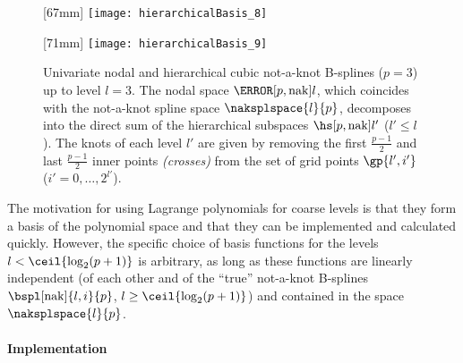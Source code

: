 \begin{figure}
  [67mm]{%
    \texttt{[image: hierarchicalBasis\_8]}%
  }%
  \hfill%
  \hfill%
  [71mm]{%
    \texttt{[image: hierarchicalBasis\_9]}%
  }%
  \caption[%
    Nodal and hierarchical not-a-knot B-splines%
  ]{%
    Univariate nodal and hierarchical cubic not-a-knot B-splines ($p = 3$)
    up to level $l = 3$.
    The nodal space $\nsbspl[\nak]{l}{p}$,
    which coincides with the not-a-knot spline space $\naksplspace{l}{p}$,
    decomposes into the direct sum
    of the hierarchical subspaces $\hsbspl[\nak]{l'}{p}$ ($l' \le l$).
    The knots of each level $l'$ are given by removing the
    first $\tfrac{p-1}{2}$ and last $\tfrac{p-1}{2}$
    inner points \emph{(crosses)}
    from the set of grid points $\gp{l',i'}$
    ($i' = 0, \dotsc, 2^{l'}$).%
  }%
  \label{fig:notAKnotBSpline}%
\end{figure}

The motivation for using Lagrange polynomials for coarse levels
is that they form a basis of the polynomial space
and that they can be implemented and calculated quickly.
However, the specific choice of basis functions for the levels
$l < \ceil{\log_2(p + 1)}$ is arbitrary,
as long as these functions are linearly independent
(of each other and of the ``true'' not-a-knot B-splines
$\bspl[\nak]{l,i}{p}$, $l \ge \ceil{\log_2(p+1)}$)
and contained in the space $\naksplspace{l}{p}$.

\paragraph{Implementation}


